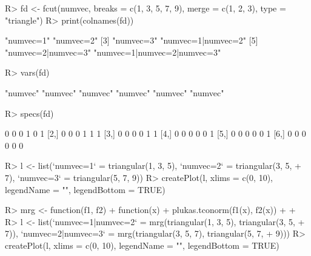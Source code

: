 \documentclass{article}\usepackage[]{graphicx}\usepackage[]{color}
\begin{document}
\begin{Schunk}
% --begin: "fcut.merge2"
\begin{Sinput}
R> fd <- fcut(numvec, breaks = c(1, 3, 5, 7, 9), merge = c(1, 2, 3), type = "triangle")
R> print(colnames(fd))
\end{Sinput}
\begin{Soutput}
[1] "numvec=1"                   "numvec=2"                  
[3] "numvec=3"                   "numvec=1|numvec=2"         
[5] "numvec=2|numvec=3"          "numvec=1|numvec=2|numvec=3"
\end{Soutput}
%
% --end: "fcut.merge2"
\end{Schunk}

\begin{Schunk}
% --begin: "fcut.varsspecs"
\begin{Sinput}
R> vars(fd)
\end{Sinput}
\begin{Soutput}
[1] "numvec" "numvec" "numvec" "numvec" "numvec" "numvec"
\end{Soutput}
\begin{Sinput}
R> specs(fd)
\end{Sinput}
\begin{Soutput}
     [,1] [,2] [,3] [,4] [,5] [,6]
[1,]    0    0    0    1    0    1
[2,]    0    0    0    1    1    1
[3,]    0    0    0    0    1    1
[4,]    0    0    0    0    0    1
[5,]    0    0    0    0    0    1
[6,]    0    0    0    0    0    0
\end{Soutput}
%
% --end: "fcut.varsspecs"
\end{Schunk}


\begin{Schunk}
\begin{Sinput}
R> l <- list(`numvec=1` = triangular(1, 3, 5), `numvec=2` = triangular(3, 5, 
+      7), `numvec=3` = triangular(5, 7, 9))
R> createPlot(l, xlims = c(0, 10), legendName = "", legendBottom = TRUE)
\end{Sinput}
\end{Schunk}

\begin{Schunk}
\begin{Sinput}
R> mrg <- function(f1, f2) {
+      function(x) {
+          plukas.tconorm(f1(x), f2(x))
+      }
+  }
R> l <- list(`numvec=1|numvec=2` = mrg(triangular(1, 3, 5), triangular(3, 5, 
+      7)), `numvec=2|numvec=3` = mrg(triangular(3, 5, 7), triangular(5, 7, 
+      9)))
R> createPlot(l, xlims = c(0, 10), legendName = "", legendBottom = TRUE)
\end{Sinput}
\end{Schunk}
\end{document}

